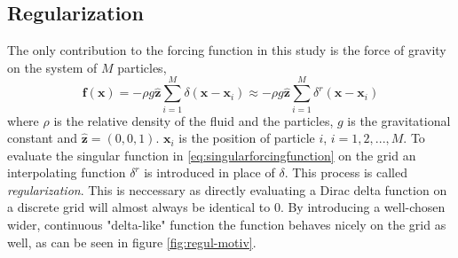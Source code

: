 \documentclass[a4paper,
twoside=false,abstract=false,numbers=noenddot,
titlepage=false,headings=small,parskip=half,version=last]{scrartcl}
\begin{document}
\subsection{Regularization\label{section:regularization}}
The only contribution to the forcing function in this study is the force of gravity on the system of $M$ particles,
\begin{equation}
\mathbf{f}(\mathbf{x}) = -\rho g\hat{\mathbf{z}}\sum_{i=1}^M \delta (\mathbf{x}-\mathbf{x}_i)\label{eq:singularforcingfunction}
\approx -\rho g\hat{\mathbf{z}}\sum_{i=1}^M \delta^{r} (\mathbf{x}-\mathbf{x}_i)
\end{equation}
where $\rho$ is the relative density of the fluid and the particles, $g$ is the gravitational constant and $\hat{\mathbf{z}}=(0,0,1)$. $\mathbf{x}_i$ is the position of particle $i$, $i=1,2,...,M$.
To evaluate the singular function in \eqref{eq:singularforcingfunction} on the grid an interpolating function $\delta^{r}$ is introduced in place of $\delta$.
This process is called \emph{regularization}.
This is neccessary as directly evaluating a Dirac delta function on a discrete grid will almost always be identical to $0$.
By introducing a well-chosen wider, continuous "delta-like" function the function behaves nicely on the grid as well, as can be seen in figure \ref{fig:regul-motiv}.
\end{document}

